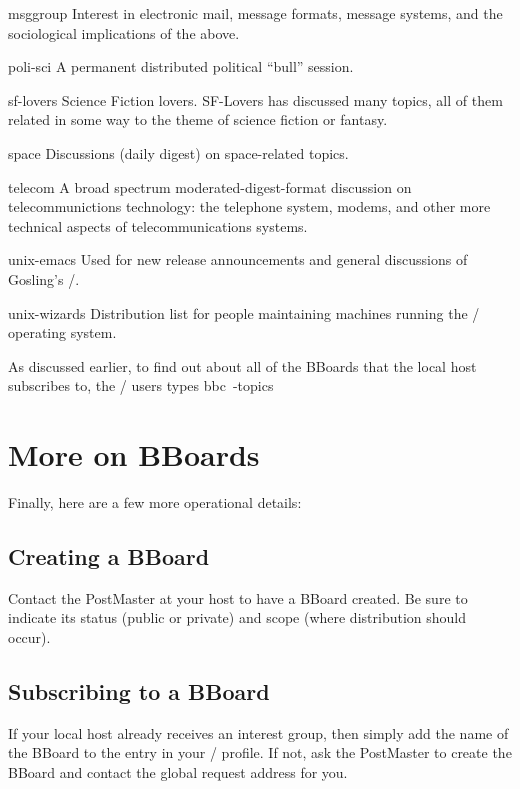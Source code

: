 {\item{\tx msggroup}
Interest in electronic mail, message formats, message systems, and the 
sociological implications of the above.

\item{\tx poli-sci}
A permanent distributed political ``bull'' session.

\item{\tx sf-lovers}
Science Fiction lovers.
{\sf SF-Lovers} has discussed many topics,
all of them related in some way to the theme of science fiction or fantasy.  

\item{\tx space}
Discussions (daily digest) on space-related topics.

\item{\tx telecom}
A broad spectrum moderated-digest-format discussion on telecommunictions 
technology: the telephone system, modems, and other more technical aspects 
of telecommunications systems.  

\item{\tx unix-emacs}
Used for new release announcements and general discussions of Gosling's
\EMACS/.

\item{\tx unix-wizards}
Distribution list for people maintaining machines running the \unix/ operating
system.
\medskip}
\noindent
As discussed earlier,
to find out about all of the BBoards that the local host subscribes to,
the \MH/ users types \example bbc\ -topics\endexample

\section{More on BBoards}
Finally, here are a few more operational details:

\subsection{Creating a BBoard}
Contact the PostMaster at your host to have a BBoard created.
Be sure to indicate its status (public or private)
and scope (where distribution should occur).

\subsection{Subscribing to a BBoard}
If your local host already receives an interest group,
then simply add the name of the BBoard to the  entry in your
\MH/ profile.
If not, ask the PostMaster to create the BBoard and contact the global
request address for you.

